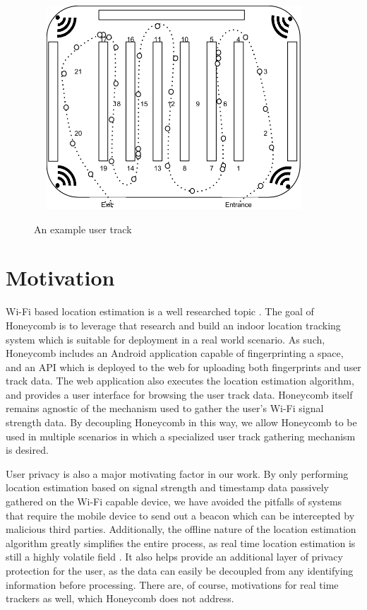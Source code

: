 \begin{figure}[htb] %
	\begin{center}
		\ \includegraphics[width=4in,height=3in]{ExampleUserTrack.png}
		\caption{An example user track}
		\label{usertrackexample}
	\end{center}
\end{figure}


\section{Motivation}
%

Wi-Fi based location estimation is a well researched topic \cite{liu2007survey}. The goal of Honeycomb is to leverage that research and build an indoor location tracking system which is suitable for deployment in a real world scenario.  As such, Honeycomb includes an Android application capable of fingerprinting a space, and an API which is deployed to the web for uploading both fingerprints and user track data. The web application also executes the location estimation algorithm, and provides a user interface for browsing the user track data. Honeycomb itself remains agnostic of the mechanism used to gather the user's Wi-Fi signal strength data. By decoupling Honeycomb in this way, we allow Honeycomb to be used in multiple scenarios in which a specialized user track gathering mechanism is desired. 

User privacy is also a major motivating factor in our work. By only performing location estimation based on signal strength and timestamp data passively gathered on the Wi-Fi capable device, we have avoided the pitfalls of systems that require the mobile device to send out a beacon \cite{ito2005bayesian} \cite{xiong2012towards} which can be intercepted by malicious third parties. Additionally, the offline nature of the location estimation algorithm greatly simplifies the entire process, as real time location estimation is still a highly volatile field \cite{turner2011empirical}. It also helps provide an additional layer of privacy protection for the user, as the data can easily be decoupled from any identifying information before processing. There are, of course, motivations for real time trackers as well, which Honeycomb does not address.
 
